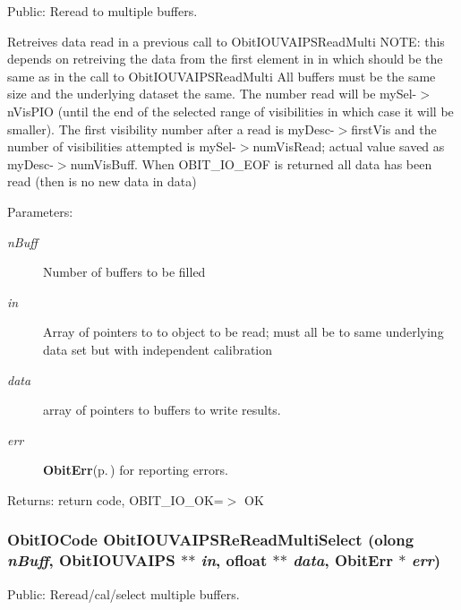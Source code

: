Public: Reread to multiple buffers. 

Retreives data read in a previous call to Obit\-IOUVAIPSRead\-Multi NOTE: this depends on retreiving the data from the first element in in which should be the same as in the call to Obit\-IOUVAIPSRead\-Multi All buffers must be the same size and the underlying dataset the same. The number read will be my\-Sel-$>$n\-Vis\-PIO (until the end of the selected range of visibilities in which case it will be smaller). The first visibility number after a read is my\-Desc-$>$first\-Vis and the number of visibilities attempted is my\-Sel-$>$num\-Vis\-Read; actual value saved as my\-Desc-$>$num\-Vis\-Buff. When OBIT\_\-IO\_\-EOF is returned all data has been read (then is no new data in data) \begin{Desc}
\item[Parameters:]
\begin{description}
\item[{\em n\-Buff}]Number of buffers to be filled \item[{\em in}]Array of pointers to to object to be read; must all be to same underlying data set but with independent calibration \item[{\em data}]array of pointers to buffers to write results. \item[{\em err}]{\bf Obit\-Err}{\rm (p.\,\pageref{structObitErr})} for reporting errors. \end{description}
\end{Desc}
\begin{Desc}
\item[Returns:]return code, OBIT\_\-IO\_\-OK=$>$ OK \end{Desc}
\subsubsection{\setlength{\rightskip}{0pt plus 5cm}Obit\-IOCode Obit\-IOUVAIPSRe\-Read\-Multi\-Select ({\bf olong} {\em n\-Buff}, {\bf Obit\-IOUVAIPS} $\ast$$\ast$ {\em in}, {\bf ofloat} $\ast$$\ast$ {\em data}, {\bf Obit\-Err} $\ast$ {\em err})}\label{ObitIOUVAIPS_8h_a18}


Public: Reread/cal/select multiple buffers. 

